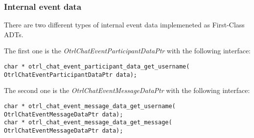 \subsubsection{Internal event data}
There are two different types of internal event data implemeneted as First-Class ADTs.

The first one is the \emph{OtrlChatEventParticipantDataPtr} with the following interface:
\begin{lstlisting}[caption={OtrlChatEventDataPtr First-Class ADT interface}]
char * otrl_chat_event_participant_data_get_username( OtrlChatEventParticipantDataPtr data);
\end{lstlisting}

The second one is the \emph{OtrlChatEventMessageDataPtr} with the following interface:
\begin{lstlisting}[caption={OtrlChatEventDataPtr First-Class ADT interface}]
char * otrl_chat_event_message_data_get_username( OtrlChatEventMessageDataPtr data);
char * otrl_chat_event_message_data_get_message( OtrlChatEventMessageDataPtr data);
\end{lstlisting}